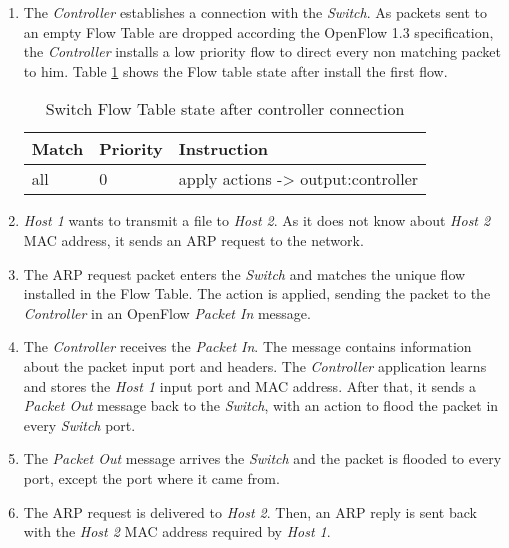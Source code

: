 \begin{enumerate}

\item The \textit{Controller} establishes a connection with the \textit{Switch}. As packets sent to an empty Flow Table are dropped according the OpenFlow 1.3 specification, the  \textit{Controller} installs a low priority flow to direct every non matching packet to him. Table \ref{tab:initialtable} shows the Flow table state after install the first flow.  

\begin{table}[h]
\centering
\caption{Switch Flow Table state after controller connection}
\label{tab:initialtable}
\begin{tabular}{|l|l|l|}
\hline
\textbf{Match}  & \textbf{Priority} & \textbf{Instruction}                              \\ \hline
all             & 0                 & apply actions -> output:controller                \\ \hline
\end{tabular}
\end{table}

\item \textit{Host 1} wants to transmit a file to \textit{Host 2}. As it does not know about \textit{Host 2} MAC address, it sends an ARP \cite{rfc826} request to the network.

\item The ARP request packet enters the \textit{Switch} and matches the unique flow installed in the Flow Table. The action is applied, sending the packet to the  \textit{Controller} in an OpenFlow \textit{Packet In} message.

\item The  \textit{Controller} receives the \textit{Packet In}. The message contains information about the packet input port and headers. The  \textit{Controller} application learns and stores the \textit{Host 1} input port and MAC address. After that, it sends a \textit{Packet Out} message back to the \textit{Switch}, with an action to flood the packet in every \textit{Switch} port.   

\item The \textit{Packet Out} message arrives the \textit{Switch} and the packet is flooded to every port, except the port where it came from.

\item The ARP request is delivered to \textit{Host 2}. Then, an ARP reply is sent back with the \textit{Host 2} MAC address required by \textit{Host 1}.


\end{enumerate}
